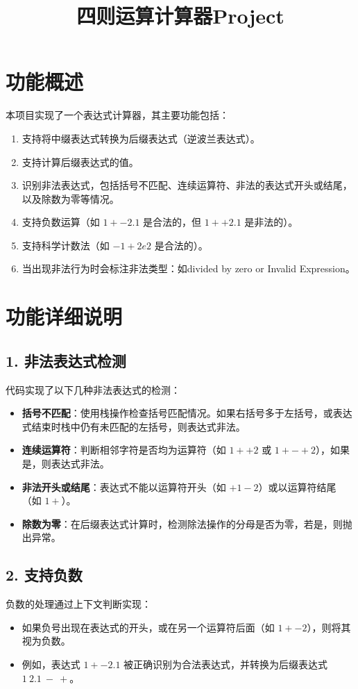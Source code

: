\documentclass[12pt]{ctexart}
\title{四则运算计算器Project}
\author{}
\date{}
\begin{document}
\maketitle

\section*{功能概述}
本项目实现了一个表达式计算器，其主要功能包括：
\begin{enumerate}
    \item 支持将中缀表达式转换为后缀表达式（逆波兰表达式）。
    \item 支持计算后缀表达式的值。
    \item 识别非法表达式，包括括号不匹配、连续运算符、非法的表达式开头或结尾，以及除数为零等情况。
    \item 支持负数运算（如 $1 + -2.1$ 是合法的，但 $1++2.1$ 是非法的）。
    \item 支持科学计数法（如 $-1+2e2$ 是合法的）。
    \item 当出现非法行为时会标注非法类型：如divided by zero or Invalid Expression。
\end{enumerate}

\section*{功能详细说明}

\subsection*{1. 非法表达式检测}
代码实现了以下几种非法表达式的检测：
\begin{itemize}
    \item \textbf{括号不匹配}：使用栈操作检查括号匹配情况。如果右括号多于左括号，或表达式结束时栈中仍有未匹配的左括号，则表达式非法。
    \item \textbf{连续运算符}：判断相邻字符是否均为运算符（如 $1++2$ 或 $1+-+2$），如果是，则表达式非法。
    \item \textbf{非法开头或结尾}：表达式不能以运算符开头（如 $+1-2$）或以运算符结尾（如 $1+$）。
    \item \textbf{除数为零}：在后缀表达式计算时，检测除法操作的分母是否为零，若是，则抛出异常。
\end{itemize}

\subsection*{2. 支持负数}
负数的处理通过上下文判断实现：
\begin{itemize}
    \item 如果负号出现在表达式的开头，或在另一个运算符后面（如 $1 + -2$），则将其视为负数。
    \item 例如，表达式 $1 + -2.1$ 被正确识别为合法表达式，并转换为后缀表达式 $1\ 2.1\ -\ +$。
\end{itemize}
\end{document}
